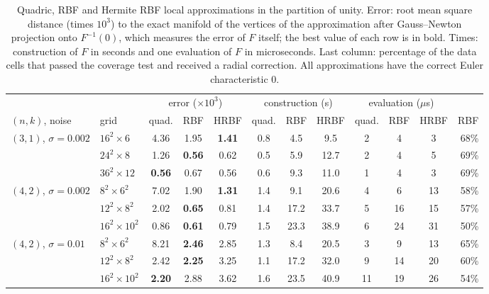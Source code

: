 \begin{table}[t]
\caption{Quadric, RBF and Hermite RBF local approximations in the partition of unity. Error: root mean square
distance (times $10^{3}$) to the exact manifold of the vertices of the approximation after Gauss--Newton projection
onto $F^{-1}(0)$, which measures the error of $F$ itself; the best value of each row is in bold. Times: construction
of $F$ in seconds and one evaluation of $F$ in microseconds. Last column: percentage of the data cells that passed
the coverage test and received a radial correction. All approximations have the correct Euler characteristic $0$.}
\label{tab:ml:rbf}
\centering\footnotesize\setlength{\tabcolsep}{2.0pt}
\begin{tabular}{@{}llccccccccc r@{}}
\toprule
& & \multicolumn{3}{c}{error ($\times10^{3}$)} & \multicolumn{3}{c}{construction (s)} & \multicolumn{3}{c}{evaluation ($\mu$s)} & \\
\cmidrule(lr){3-5}\cmidrule(lr){6-8}\cmidrule(lr){9-11}
$(n,k)$, noise & grid & quad. & RBF & HRBF & quad. & RBF & HRBF & quad. & RBF & HRBF & RBF\\
\midrule
\multirow{3}{*}{$(3,1)$, $\sigma{=}0.002$} & $16^2{\times}6$ & 4.36 & 1.95 & \textbf{1.41} & 0.8 & 4.5 & 9.5 & 2 & 4 & 3 & 68\% \\
 & $24^2{\times}8$ & 1.26 & \textbf{0.56} & 0.62 & 0.5 & 5.9 & 12.7 & 2 & 4 & 5 & 69\% \\
 & $36^2{\times}12$ & \textbf{0.56} & 0.67 & 0.56 & 0.6 & 9.3 & 11.0 & 1 & 4 & 3 & 69\% \\
\midrule
\multirow{3}{*}{$(4,2)$, $\sigma{=}0.002$} & $8^2{\times}6^2$ & 7.02 & 1.90 & \textbf{1.31} & 1.4 & 9.1 & 20.6 & 4 & 6 & 13 & 58\% \\
 & $12^2{\times}8^2$ & 2.02 & \textbf{0.65} & 0.81 & 1.4 & 17.2 & 33.7 & 5 & 16 & 15 & 57\% \\
 & $16^2{\times}10^2$ & 0.86 & \textbf{0.61} & 0.79 & 1.5 & 23.3 & 38.9 & 6 & 24 & 31 & 50\% \\
\midrule
\multirow{3}{*}{$(4,2)$, $\sigma{=}0.01$} & $8^2{\times}6^2$ & 8.21 & \textbf{2.46} & 2.85 & 1.3 & 8.4 & 20.5 & 3 & 9 & 13 & 65\% \\
 & $12^2{\times}8^2$ & 2.42 & \textbf{2.25} & 3.25 & 1.1 & 17.2 & 32.0 & 9 & 14 & 20 & 60\% \\
 & $16^2{\times}10^2$ & \textbf{2.20} & 2.88 & 3.62 & 1.6 & 23.5 & 40.9 & 11 & 19 & 26 & 54\% \\
\bottomrule
\end{tabular}
\end{table}
